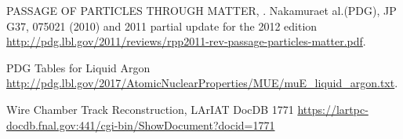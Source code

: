 \begin{thebibliography}{99}
\footnotesize

PASSAGE OF PARTICLES THROUGH MATTER, . Nakamuraet al.(PDG), JP G37, 075021 (2010) and 2011 partial update for the 2012 edition \url{http://pdg.lbl.gov/2011/reviews/rpp2011-rev-passage-particles-matter.pdf}.

PDG Tables for Liquid Argon \url{http://pdg.lbl.gov/2017/AtomicNuclearProperties/MUE/muE_liquid_argon.txt}. 

Wire Chamber Track Reconstruction, LArIAT DocDB 1771 \url{https://lartpc-docdb.fnal.gov:441/cgi-bin/ShowDocument?docid=1771}

\end{thebibliography}
\textbf{}